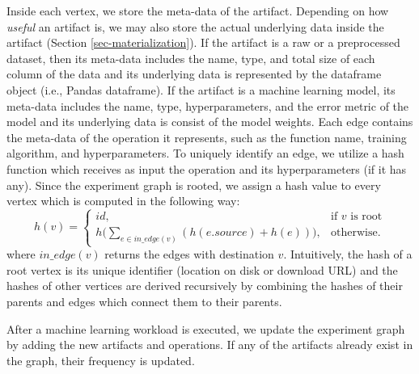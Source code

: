 Inside each vertex, we store the meta-data of the artifact.
Depending on how \textit{useful} an artifact is, we may also store the actual underlying data inside the artifact (Section \ref{sec-materialization}).
If the artifact is a raw or a preprocessed dataset, then its meta-data includes the name, type, and total size of each column of the data and its underlying data is represented by the dataframe object (i.e., Pandas dataframe). 
If the artifact is a machine learning model, its meta-data includes the name, type, hyperparameters, and the error metric of the model and its underlying data is consist of the model weights.
Each edge contains the meta-data of the operation it represents, such as the function name, training algorithm, and hyperparameters.
To uniquely identify an edge, we utilize a hash function which receives as input the operation and its hyperparameters (if it has any).
Since the experiment graph is rooted, we assign a hash value to every vertex which is computed in the following way:
\[
    h(v)= 
\begin{cases}
    id,& \text{if } v \text{ is root}\\
    h\Big(\sum\limits_{e \in in\_edge(v)} (h(e.source) + h(e) ) \Big)  ,              & \text{otherwise}.
\end{cases}
\]
where $in\_edge(v)$ returns the edges with destination $v$. 
Intuitively, the hash of a root vertex is its unique identifier (location on disk or download URL) and the hashes of other vertices are derived recursively by combining the hashes of their parents and edges which connect them to their parents.

After a machine learning workload is executed, we update the experiment graph by adding the new artifacts and operations.
If any of the artifacts already exist in the graph, their frequency is updated.





